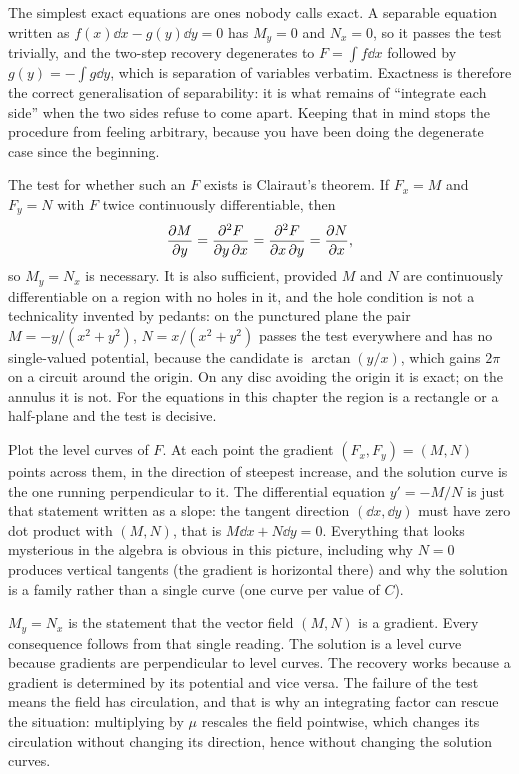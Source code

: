 The simplest exact equations are ones nobody calls exact. A separable equation written as $f(x)\dd x-g(y)\dd y=0$ has $M_y=0$ and $N_x=0$, so it passes the test trivially, and the two-step recovery degenerates to $F=\int f\dd x$ followed by $g(y)=-\int g\dd y$, which is separation of variables verbatim. Exactness is therefore the correct generalisation of separability: it is what remains of ``integrate each side'' when the two sides refuse to come apart. Keeping that in mind stops the procedure from feeling arbitrary, because you have been doing the degenerate case since the beginning.

The test for whether such an $F$ exists is Clairaut's theorem. If $F_x=M$ and $F_y=N$ with $F$ twice continuously differentiable, then
\[\frac{\partial M}{\partial y}=\frac{\partial^{2}F}{\partial y\,\partial x}=\frac{\partial^{2}F}{\partial x\,\partial y}=\frac{\partial N}{\partial x},\]
so $M_y=N_x$ is necessary. It is also sufficient, provided $M$ and $N$ are continuously differentiable on a region with no holes in it, and the hole condition is not a technicality invented by pedants: on the punctured plane the pair $M=-y/(x^{2}+y^{2})$, $N=x/(x^{2}+y^{2})$ passes the test everywhere and has no single-valued potential, because the candidate is $\arctan(y/x)$, which gains $2\pi$ on a circuit around the origin. On any disc avoiding the origin it is exact; on the annulus it is not. For the equations in this chapter the region is a rectangle or a half-plane and the test is decisive.

\begin{keynote}
Plot the level curves of $F$. At each point the gradient $(F_x,F_y)=(M,N)$ points across them, in the direction of steepest increase, and the solution curve is the one running perpendicular to it. The differential equation $y'=-M/N$ is just that statement written as a slope: the tangent direction $(\dd x,\dd y)$ must have zero dot product with $(M,N)$, that is $M\dd x+N\dd y=0$. Everything that looks mysterious in the algebra is obvious in this picture, including why $N=0$ produces vertical tangents (the gradient is horizontal there) and why the solution is a family rather than a single curve (one curve per value of $C$).
\end{keynote}

\begin{keynote}
$M_y=N_x$ is the statement that the vector field $(M,N)$ is a gradient. Every consequence follows from that single reading. The solution is a level curve because gradients are perpendicular to level curves. The recovery works because a gradient is determined by its potential and vice versa. The failure of the test means the field has circulation, and that is why an integrating factor can rescue the situation: multiplying by $\mu$ rescales the field pointwise, which changes its circulation without changing its direction, hence without changing the solution curves.
\end{keynote}

